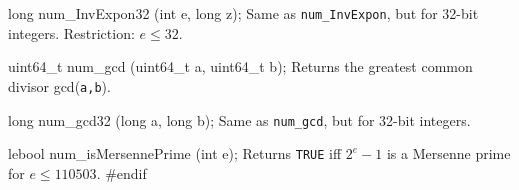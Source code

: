 long num_InvExpon32 (int e, long z);
 \endcode
 \tab  Same as \texttt{num\_InvExpon}, but for 32-bit integers.
  Restriction: $e \le 32$.
\endtab
\code

uint64_t num_gcd (uint64_t a, uint64_t b);
 \endcode
 \tab  Returns the greatest common divisor gcd(\texttt{a,b}).
\endtab
\code

long num_gcd32 (long a, long b);
 \endcode
 \tab  Same as \texttt{num\_gcd}, but for 32-bit integers.
\endtab
\code

lebool num_isMersennePrime (int e);
 \endcode
 \tab  Returns \texttt{TRUE} iff $2^e-1$ is a Mersenne prime for $e \le 110503$.
\endtab
\code\hide
#endif
\endhide\endcode
